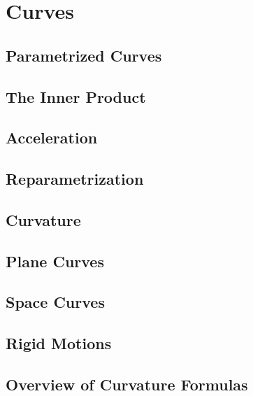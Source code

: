 \chapter{Curves}

\section{Parametrized Curves}

\section{The Inner Product}

\section{Acceleration}

\section{Reparametrization}

\section{Curvature}

\section{Plane Curves}

\section{Space Curves}

\section{Rigid Motions}

\section{Overview of Curvature Formulas}
